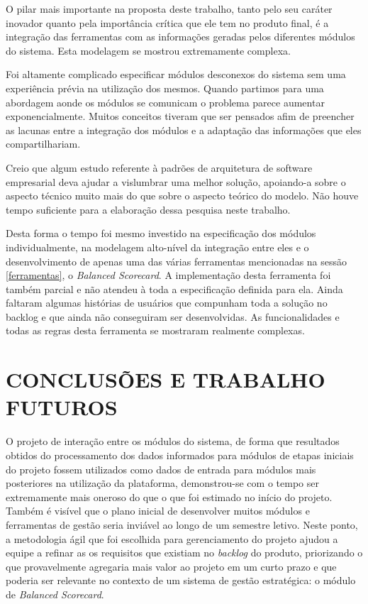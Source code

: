 \documentclass{abnt}
\begin{document}
O pilar mais importante na proposta deste trabalho, tanto pelo seu caráter
inovador quanto pela importância crítica que ele tem no produto final, é a
integração das ferramentas com as informações geradas pelos diferentes módulos
do sistema. Esta modelagem se mostrou extremamente complexa. 

Foi altamente complicado especificar módulos desconexos do sistema sem uma
experiência prévia na utilização dos mesmos. Quando partimos para uma abordagem
aonde os módulos se comunicam o problema parece aumentar exponencialmente.
Muitos conceitos tiveram que ser pensados afim de preencher as lacunas entre a
integração dos módulos e a adaptação das informações que eles compartilhariam.

Creio que algum estudo referente à padrões de arquitetura de software
empresarial deva ajudar a vislumbrar uma melhor solução, apoiando-a sobre o
aspecto técnico muito mais do que sobre o aspecto teórico do modelo. Não houve
tempo suficiente para a elaboração dessa pesquisa neste trabalho. 

Desta forma o tempo foi mesmo investido na especificação dos módulos
individualmente, na modelagem alto-nível da integração entre eles e o
desenvolvimento de apenas uma das várias ferramentas mencionadas na sessão 
\ref{ferramentas}, o \textit{Balanced Scorecard}. A implementação desta
ferramenta foi também parcial e não atendeu à toda a especificação definida para
ela. Ainda faltaram algumas histórias de usuários que compunham toda a solução
no backlog e que ainda não conseguiram ser desenvolvidas. As funcionalidades e
todas as regras desta ferramenta se mostraram realmente complexas.

\chapter{CONCLUSÕES E TRABALHO FUTUROS}

O projeto de interação entre os módulos do sistema, de forma que resultados
obtidos do processamento dos dados informados para módulos de etapas iniciais do
projeto fossem utilizados como dados de entrada para módulos mais
posteriores na utilização da plataforma, demonstrou-se com o tempo ser
extremamente mais oneroso do que o que foi estimado no início do projeto. Também
é visível que o plano inicial de desenvolver muitos módulos e ferramentas de
gestão seria inviável ao longo de um semestre letivo. Neste ponto, a metodologia
ágil que foi escolhida para gerenciamento do projeto ajudou a equipe a refinar
as os requisitos que existiam no \textit{backlog} do produto, priorizando o que
provavelmente agregaria mais valor ao projeto em um curto prazo e que poderia
ser relevante no contexto de um sistema de gestão estratégica: o módulo de
\textit{Balanced Scorecard}.
\end{document}

